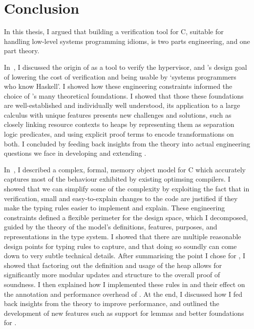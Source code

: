\chapter{Conclusion}%
\label{chap:conclusion}

\margintoc{}

In this thesis, I argued that building a verification tool for C, suitable
for handling low-level systems programming idioms, is two parts engineering,
and one part theory.

In~, I discussed the origin of  as a tool
to verify the  hypervisor, and 's design goal of lowering the
cost of verification and being usable by `systems programmers who know
Haskell'. I showed how these engineering constraints informed the choice of
's many theoretical foundations. I showed that those these foundations
are well-established and individually well understood, its application to a
large calculus  with unique features presents new challenges and
solutions, such as closely linking resource contexts to heaps by representing
them as separation logic predicates, and using explicit proof terms to encode
transformations on both. I concluded by feeding back insights from the theory
into actual engineering questions we face in developing and extending .

In~, I described a complex, formal, memory object
model for C which accurately captures most of the behaviour exhibited by
existing optimsing compilers. I showed that we can simplify some of the
complexity by exploiting the fact that in verification, small and
easy-to-explain changes to the code are justified if they make the typing rules
easier to implement and explain. These engineering constraints defined a
flexible perimeter for the design space, which I decomposed, guided by the
theory of the model's definitions, features, purposes, and representations in
the  type system. I showed that there are multiple reasonable design
points for typing rules to capture, and that doing so soundly can come down to
very subtle technical details. After summarising the point I chose for
, I showed that factoring out the definition and usage of the heap
allows for significantly more modular updates and structure to the
overall proof of soundness. I then explained how I implemented these rules in
 and their effect on the annotation and performance overhead of .
At the end, I discussed how I fed back insights from the theory to improve performance,
and outlined the development of new features such as support for lemmas and
better foundations for .

